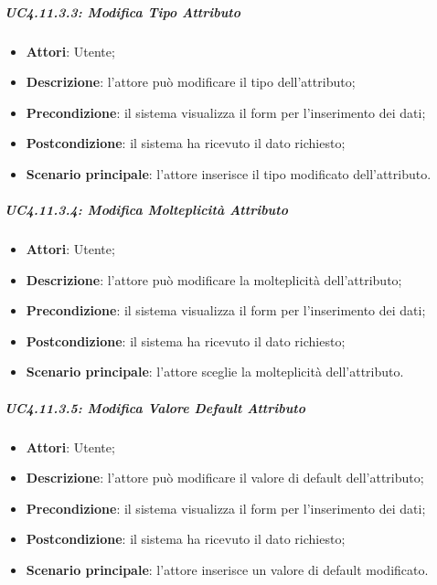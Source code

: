 \subparagraph{UC4.11.3.3: Modifica Tipo Attributo}
\label{UC4.11.3.3}
\begin{itemize}
\item \textbf{Attori}: Utente;
\item \textbf{Descrizione}: l'attore può modificare il tipo dell'attributo;	
\item \textbf{Precondizione}: il sistema visualizza il form per l'inserimento dei dati;	
\item \textbf{Postcondizione}: il sistema ha ricevuto il dato richiesto;	
\item \textbf{Scenario principale}:
l'attore inserisce il tipo modificato dell'attributo.	
\end{itemize}

\subparagraph{UC4.11.3.4: Modifica Molteplicità Attributo}
\label{UC4.11.3.4}
\begin{itemize}
\item \textbf{Attori}: Utente;
\item \textbf{Descrizione}: l'attore può modificare la molteplicità dell'attributo;	
\item \textbf{Precondizione}: il sistema visualizza il form per l'inserimento dei dati;	
\item \textbf{Postcondizione}: il sistema ha ricevuto il dato richiesto;	
\item \textbf{Scenario principale}:
l'attore sceglie la molteplicità dell'attributo.
\end{itemize}

\subparagraph{UC4.11.3.5: Modifica Valore Default Attributo}
\label{UC4.11.3.5}
\begin{itemize}
\item \textbf{Attori}: Utente;
\item \textbf{Descrizione}: l'attore può modificare il valore di default dell'attributo;	
\item \textbf{Precondizione}: il sistema visualizza il form per l'inserimento dei dati;	
\item \textbf{Postcondizione}: il sistema ha ricevuto il dato richiesto;	
\item \textbf{Scenario principale}:
l'attore inserisce un valore di default modificato.	
\end{itemize}

